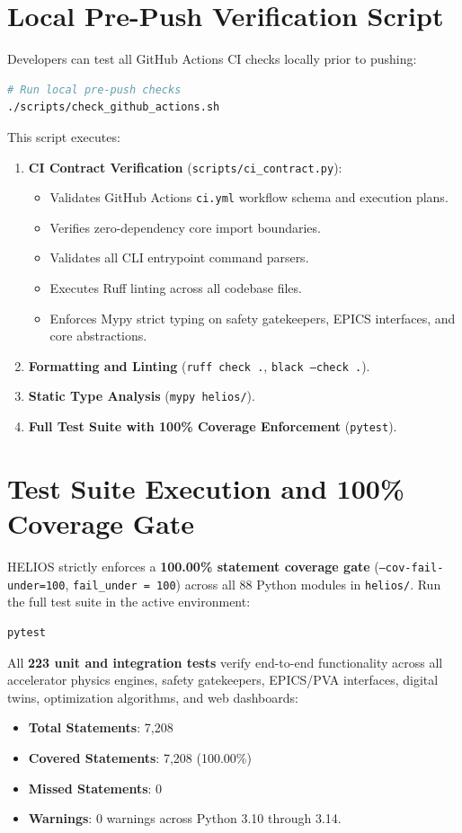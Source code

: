 \documentclass[11pt,a4paper]{report}
\begin{document}
\section{Local Pre-Push Verification Script}
Developers can test all GitHub Actions CI checks locally prior to pushing:
\begin{lstlisting}[language=bash]
# Run local pre-push checks
./scripts/check_github_actions.sh
\end{lstlisting}
This script executes:
\begin{enumerate}
    \item \textbf{CI Contract Verification} (\texttt{scripts/ci\_contract.py}):
    \begin{itemize}
        \item Validates GitHub Actions \texttt{ci.yml} workflow schema and execution plans.
        \item Verifies zero-dependency core import boundaries.
        \item Validates all CLI entrypoint command parsers.
        \item Executes Ruff linting across all codebase files.
        \item Enforces Mypy strict typing on safety gatekeepers, EPICS interfaces, and core abstractions.
    \end{itemize}
    \item \textbf{Formatting and Linting} (\texttt{ruff check .}, \texttt{black --check .}).
    \item \textbf{Static Type Analysis} (\texttt{mypy helios/}).
    \item \textbf{Full Test Suite with 100\% Coverage Enforcement} (\texttt{pytest}).
\end{enumerate}

\section{Test Suite Execution and 100\% Coverage Gate}
HELIOS strictly enforces a \textbf{100.00\% statement coverage gate} (\texttt{--cov-fail-under=100}, \texttt{fail\_under = 100}) across all 88 Python modules in \texttt{helios/}. Run the full test suite in the active environment:
\begin{lstlisting}[language=bash]
pytest
\end{lstlisting}
All \textbf{223 unit and integration tests} verify end-to-end functionality across all accelerator physics engines, safety gatekeepers, EPICS/PVA interfaces, digital twins, optimization algorithms, and web dashboards:
\begin{itemize}
    \item \textbf{Total Statements}: 7{,}208
    \item \textbf{Covered Statements}: 7{,}208 (100.00\%)
    \item \textbf{Missed Statements}: 0
    \item \textbf{Warnings}: 0 warnings across Python 3.10 through 3.14.
\end{itemize}
\end{document}
